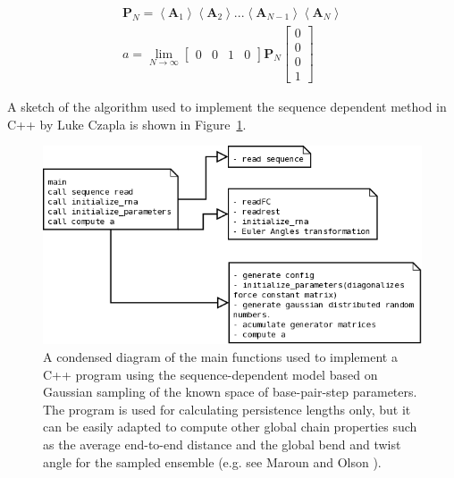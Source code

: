 \begin{gather}
\mathbf{P}_{N} = \left<\mathbf{A}_{1}\right> \left<\mathbf{A}_{2}\right> ... \left<
\mathbf{A}_{N-1}\right> \left< \mathbf{A}_{N}\right>\\
a = \lim_{N \to \infty} \left[\begin{array}{cccc}0 & 0 & 1 & 0\end{array}
    \right] \mathbf{P}_{N}
\left[\begin{array}{c} 0\\ 0\\ 0\\ 1\end{array}\right]
\end{gather}  

A sketch of the algorithm used to implement the sequence dependent
method in C++ by Luke Czapla is shown in Figure~\ref{fig:sketch}.

\begin{figure}
\centering
\includegraphics[angle=0, scale=0.5]{Appendix/generalschema.png}
\caption{A condensed diagram of the main functions used to implement a
  C++  program using  the sequence-dependent  model based  on Gaussian
  sampling  of  the  known  space of  base-pair-step  parameters.  The
  program is used for calculating persistence lengths only, but it can
  be easily adapted  to compute other global chain  properties such as
  the average end-to-end distance and  the global bend and twist angle
  for   the   sampled   ensemble    (e.g.   see   Maroun   and   Olson
  \cite{maroun1988b}).}
\label{fig:sketch}
\end{figure}  









